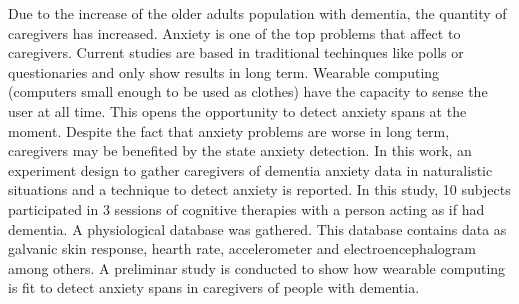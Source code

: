 Due to the increase of the older adults population with dementia, the quantity of caregivers has increased. Anxiety is one of the top problems that affect to caregivers. Current studies are based in traditional techinques like polls or questionaries and only show results in long term. Wearable computing (computers small enough to be used as clothes) have the capacity to sense the user at all time. This opens the opportunity to detect anxiety spans at the moment. Despite the fact that anxiety problems are worse in long term, caregivers may be benefited by the state anxiety detection. In this work, an experiment design to gather caregivers of dementia anxiety data  in naturalistic situations and a technique to detect anxiety is reported. In this study, 10 subjects participated in 3 sessions of cognitive therapies with a person acting as if had dementia. A physiological database was gathered. This database contains data as galvanic skin response, hearth rate, accelerometer and electroencephalogram among others. A preliminar study is conducted to show how wearable computing is fit to detect anxiety spans in caregivers of people with dementia.
